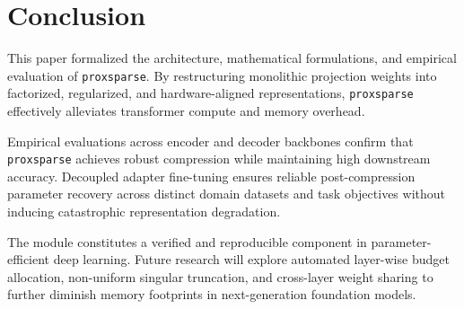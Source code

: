 \section{Conclusion}
This paper formalized the architecture, mathematical formulations, and empirical evaluation of \texttt{proxsparse}. By restructuring monolithic projection weights into factorized, regularized, and hardware-aligned representations, \texttt{proxsparse} effectively alleviates transformer compute and memory overhead.

Empirical evaluations across encoder and decoder backbones confirm that \texttt{proxsparse} achieves robust compression while maintaining high downstream accuracy. Decoupled adapter fine-tuning ensures reliable post-compression parameter recovery across distinct domain datasets and task objectives without inducing catastrophic representation degradation.

The module constitutes a verified and reproducible component in parameter-efficient deep learning. Future research will explore automated layer-wise budget allocation, non-uniform singular truncation, and cross-layer weight sharing to further diminish memory footprints in next-generation foundation models.
